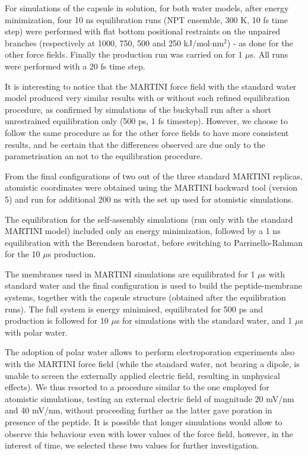 For simulations of the capsule in solution, for both water models, after energy minimization, four 10 ns equilibration runs (NPT ensemble, 300 K, 10 fs time step) were performed with flat bottom positional restraints on the unpaired branches (respectively at 1000, 750, 500 and 250 kJ/mol$\cdot$nm$^2$) - as done for the other force fields.
%
Finally the production run was carried on for 1 $\mu$s. All runs were performed with a 20 fs time step.

It is interesting to notice that the MARTINI force field with the standard water model produced very similar results with or without such refined equilibration procedure, as confirmed by simulations of the buckyball run after a short unrestrained equilibration only (500 ps, 1 fs timestep). However, we choose to follow the same procedure as for the other force fields to have more consistent results, and be certain that the differences observed are due only to the parametrisation an not to the equilibration procedure.

From the final configurations of two out of the three standard MARTINI replicas, atomistic coordinates were obtained using the MARTINI backward tool (version 5) \citep{Wassenaar2014} and run for additional 200 ns with the set up used for atomistic simulations.

The equilibration for the self-assembly simulations (run only with the standard MARTINI model) included only an energy minimization, followed by a 1 ns equilibration with the Berendsen barostat, before switching to Parrinello-Rahman for the 10 $\mu$s production.

The membranes used in MARTINI simulations are equilibrated for 1 $\mu$s with standard water and the final configuration is used to build the peptide-membrane systems, together with the capsule structure (obtained after the equilibration runs). The full system is energy minimised, equilibrated for 500 ps and production is followed for 10 $\mu$s for simulations with the standard water, and 1 $\mu$s with polar water.

The adoption of polar water allows to perform electroporation experiments also with the MARTINI force field (while the standard water, not bearing a dipole, is unable to screen the externally applied electric field, resulting in unphysical effects).
%
We thus resorted to a procedure similar to the one employed for atomistic simulations, testing an external electric field of magnitude 20 mV/nm and 40 mV/nm, without proceeding further as the latter gave poration in presence of the peptide.
%
It is possible that longer simulations would allow to observe this behaviour even with lower values of the force field, however, in the interest of time, we selected these two values for further investigation.

